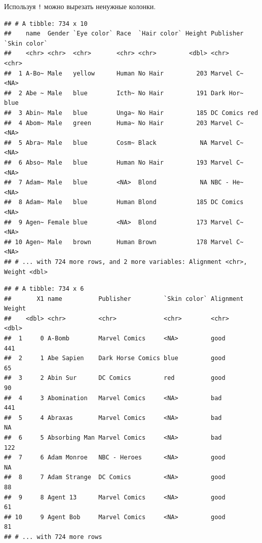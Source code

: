 \documentclass[]{book}
\newenvironment{Shaded}{\begin{snugshade}}{\end{snugshade}}
\newcommand{\KeywordTok}[1]{\textcolor[rgb]{0.13,0.29,0.53}{\textbf{#1}}}
\newcommand{\StringTok}[1]{\textcolor[rgb]{0.31,0.60,0.02}{#1}}
\newcommand{\OperatorTok}[1]{\textcolor[rgb]{0.81,0.36,0.00}{\textbf{#1}}}
\newcommand{\NormalTok}[1]{#1}
\begin{document}
Используя \texttt{!} можно вырезать ненужные колонки.

\begin{Shaded}
\end{Shaded}

\begin{verbatim}
## # A tibble: 734 x 10
##    name  Gender `Eye color` Race  `Hair color` Height Publisher `Skin color`
##    <chr> <chr>  <chr>       <chr> <chr>         <dbl> <chr>     <chr>       
##  1 A-Bo~ Male   yellow      Human No Hair         203 Marvel C~ <NA>        
##  2 Abe ~ Male   blue        Icth~ No Hair         191 Dark Hor~ blue        
##  3 Abin~ Male   blue        Unga~ No Hair         185 DC Comics red         
##  4 Abom~ Male   green       Huma~ No Hair         203 Marvel C~ <NA>        
##  5 Abra~ Male   blue        Cosm~ Black            NA Marvel C~ <NA>        
##  6 Abso~ Male   blue        Human No Hair         193 Marvel C~ <NA>        
##  7 Adam~ Male   blue        <NA>  Blond            NA NBC - He~ <NA>        
##  8 Adam~ Male   blue        Human Blond           185 DC Comics <NA>        
##  9 Agen~ Female blue        <NA>  Blond           173 Marvel C~ <NA>        
## 10 Agen~ Male   brown       Human Brown           178 Marvel C~ <NA>        
## # ... with 724 more rows, and 2 more variables: Alignment <chr>, Weight <dbl>
\end{verbatim}

\begin{Shaded}
\end{Shaded}

\begin{verbatim}
## # A tibble: 734 x 6
##       X1 name          Publisher         `Skin color` Alignment Weight
##    <dbl> <chr>         <chr>             <chr>        <chr>      <dbl>
##  1     0 A-Bomb        Marvel Comics     <NA>         good         441
##  2     1 Abe Sapien    Dark Horse Comics blue         good          65
##  3     2 Abin Sur      DC Comics         red          good          90
##  4     3 Abomination   Marvel Comics     <NA>         bad          441
##  5     4 Abraxas       Marvel Comics     <NA>         bad           NA
##  6     5 Absorbing Man Marvel Comics     <NA>         bad          122
##  7     6 Adam Monroe   NBC - Heroes      <NA>         good          NA
##  8     7 Adam Strange  DC Comics         <NA>         good          88
##  9     8 Agent 13      Marvel Comics     <NA>         good          61
## 10     9 Agent Bob     Marvel Comics     <NA>         good          81
## # ... with 724 more rows
\end{verbatim}
\end{document}
